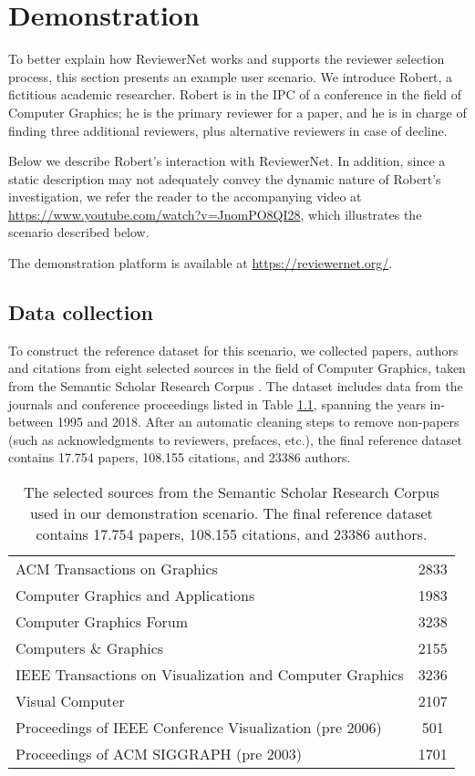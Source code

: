 \chapter{Demonstration}\label{sec:demonstration}
To better explain how ReviewerNet works and supports the reviewer selection process, this section presents an example user scenario. We introduce Robert, a fictitious academic researcher. Robert is in the IPC of a conference in the field of Computer Graphics; he is the primary reviewer for a paper, and he is in charge of finding three additional reviewers, plus alternative reviewers in case of decline. 

Below we describe Robert's interaction with ReviewerNet. In addition, since a static description may not adequately convey the dynamic nature of Robert's investigation, we refer the reader to the accompanying video at \url{https://www.youtube.com/watch?v=JnomPO8QI28}, which illustrates the scenario described below. 

The demonstration platform is available at \url{https://reviewernet.org/}.  

\section{Data collection}

To construct the reference dataset for this scenario, we collected papers, authors and citations from eight selected sources in the field of Computer Graphics, taken from the Semantic Scholar Research Corpus \cite{ammar:18}. The dataset includes data from the journals and conference proceedings listed in Table \ref{table:sources}, spanning the years in-between 1995 and 2018. After an automatic cleaning steps to remove non-papers (such as acknowledgments to reviewers, prefaces, etc.), the final reference dataset contains 17.754 papers, 108.155 citations, and 23386 authors. 

\begin{table}[!t]
\renewcommand{\arraystretch}{1.3}
\centering
\begin{tabular}{|l|c|}
\hline
ACM Transactions on Graphics & 2833\\ 
Computer Graphics and Applications  & 1983 \\ 
Computer Graphics Forum & 3238\\ 
Computers \& Graphics & 2155\\ 
IEEE Transactions on Visualization and Computer Graphics & 3236\\ 
Visual Computer & 2107\\ 
Proceedings of IEEE Conference Visualization (pre 2006) & 501 \\ 
Proceedings of ACM SIGGRAPH (pre 2003) & 1701\\
\hline
\end{tabular}
\caption{The selected sources from the Semantic Scholar Research Corpus used in our demonstration scenario. The final reference dataset contains 17.754 papers, 108.155 citations, and 23386 authors.}
\label{table:sources}
\end{table}


